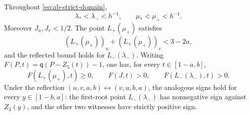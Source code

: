 \begin{lemma}
\label{lem:fixed-line-signs}
Throughout \eqref{eq:ab-strict-domain},
\begin{equation}
 \lambda_*<\lambda_-<h^{-1},\qquad
 \mu_*<\mu_+<h^{-1}.                            \label{eq:first-root-order}
\end{equation}
Moreover $J_u,J_v<1/2$.  The point $L_+(\mu_+)$ satisfies
\[
 (L_+(\mu_+))_u+(L_+(\mu_+))_v<3-2a,
\]
and the reflected bound holds for $L_-(\lambda_-)$.  Writing
$F(P,t)=\mathsf q(P-Z_5(t))-1$, one has, for every $t\in[1-a,b]$,
\begin{equation}
 F(L_+(\mu_+),t)\ge0,\qquad F(J,t)>0,\qquad
 F(L_-(\lambda_-),t)>0.                           \label{eq:moving-right-signs}
\end{equation}
Under the reflection
$(u,v,a,b)\leftrightarrow(v,u,b,a)$, the analogous signs hold for every
$y\in[1-b,a]$: the first-root point $L_-(\lambda_-)$ has nonnegative sign
against $Z_3(y)$, and the other two witnesses have strictly positive sign.
\end{lemma}

